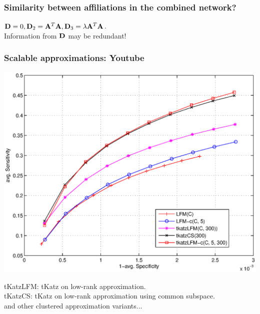 \documentclass{beamer}
\begin{document}
\begin{frame}
\frametitle{Similarity between affiliations in the combined network?}
\pause
{}
\pause
$\mathbf{D} = 0, \mathbf{D}_{2} = \mathbf{A}^{T}\mathbf{A}, \mathbf{D}_{3} = \lambda \mathbf{A}^{T}\mathbf{A}$. \\
\pause
Information from $\mathbf{D}$ may be redundant!
\end{frame}

\begin{frame}
\frametitle{Scalable approximations: Youtube}
\begin{center}
\includegraphics[scale=0.4]{../journalPaper/summarySVDKatzYoutube.eps}
\end{center}
\pause
\textsf{tKatzLFM}: \textsf{tKatz} on low-rank approximation.\\
\pause
\textsf{tKatzCS}: \textsf{tKatz} on low-rank approximation using common subspace.\\
\pause
and other clustered approximation variants...
\end{frame}
\end{document}
